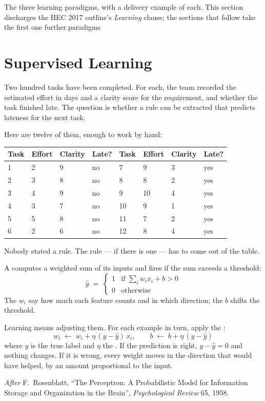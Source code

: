 {The three learning paradigms, with a delivery example of each. This section
discharges the HEC 2017 outline's \emph{Learning} clause; the sections that follow
take the first one further.}{paradigms}

\section{Supervised Learning}

Two hundred tasks have been completed. For each, the team recorded the estimated
effort in days and a clarity score for the requirement, and whether the task
finished late. The question is whether a rule can be extracted that predicts
lateness for the next task.

Here are twelve of them, enough to work by hand:

\smallskip
\noindent\begin{tabular}{@{}L{1.3cm}L{1.8cm}L{1.8cm}L{1.5cm}L{1.3cm}L{1.8cm}L{1.8cm}L{1.5cm}@{}}
\toprule
\textbf{Task} & \textbf{Effort} & \textbf{Clarity} & \textbf{Late?} &
\textbf{Task} & \textbf{Effort} & \textbf{Clarity} & \textbf{Late?} \\
 & 2 & 9 & no & 7 & 9 & 3 & yes \\
2 & 3 & 8 & no & 8 & 8 & 2 & yes \\
3 & 4 & 9 & no & 9 & 10 & 4 & yes \\
4 & 3 & 7 & no & 10 & 9 & 1 & yes \\
5 & 5 & 8 & no & 11 & 7 & 2 & yes \\
6 & 2 & 6 & no & 12 & 8 & 4 & yes \\
\bottomrule
\end{tabular}

\smallskip
Nobody stated a rule. The rule --- if there is one --- has to come out of the table.

\begin{definitionbox}
A  computes a weighted sum of its inputs and fires if the sum
exceeds a threshold:
\[
  \hat{y} \;=\;
  \begin{cases}
    1 & \text{if } \sum_{i} w_{i} x_{i} + b > 0 \\
    0 & \text{otherwise}
  \end{cases}
\]
The  $w_{i}$ say how much each feature counts and in which direction;
the  $b$ shifts the threshold.

Learning means adjusting them. For each example in turn, apply the
:
\[
  w_{i} \;\leftarrow\; w_{i} + \eta\,(y - \hat{y})\, x_{i},
  \qquad
  b \;\leftarrow\; b + \eta\,(y - \hat{y})
\]
where $y$ is the true label and $\eta$ the . If the prediction
is right, $y - \hat{y} = 0$ and nothing changes. If it is wrong, every weight moves
in the direction that would have helped, by an amount proportional to the input.

\smallskip
\noindent\emph{After} F.\ Rosenblatt, ``The Perceptron: A Probabilistic Model for
Information Storage and Organization in the Brain'', \emph{Psychological Review}
65, 1958.
\end{definitionbox}

